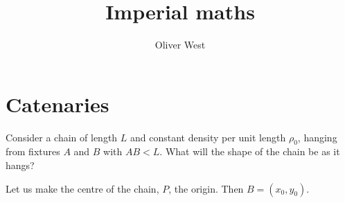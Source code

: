 \documentclass{../../template/note}
\author{Oliver West}
\title{Imperial maths}
\date{}
\begin{document}
    
    \maketitle

    \tableofcontents


    \section{Catenaries}

    Consider a chain of length $L$ and constant density per unit length $\rho_0$, hanging from fixtures $A$ and $B$ with $AB < L$. What will the shape of the chain be as it hangs?

    Let us make the centre of the chain, $P$, the origin. Then $B = (x_0, y_0)$.
\end{document}
